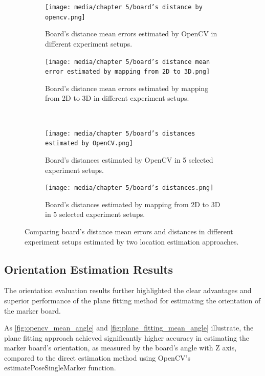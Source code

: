 \begin{figure}[htpb]
    \centering
    \begin{subfigure}[t]{0.45\textwidth}
        \centering
        \texttt{[image: media/chapter 5/board's distance by opencv.png]}
        \caption{Board's distance mean errors estimated by OpenCV in different experiment setups.}
        \label{fig:opencv_distance_mean_error}
    \end{subfigure}\hfill
    \begin{subfigure}[t]{0.45\textwidth}
        \centering
        \texttt{[image: media/chapter 5/board’s distance mean error estimated by mapping from 2D to 3D.png]}
        \caption{Board's distance mean errors estimated by mapping from 2D to 3D in different experiment setups.}
        \label{fig:2d_mapping_distanc_mean_error}
    \end{subfigure}\\
    \begin{subfigure}[t]{0.45\textwidth}
        \centering
        \texttt{[image: media/chapter 5/board’s distances estimated by OpenCV.png]}
        \caption{Board's distances estimated by OpenCV in 5 selected experiment setups.}
        \label{fig:opencv_distances}
    \end{subfigure}\hfill
    \begin{subfigure}[t]{0.45\textwidth}
        \centering
        \texttt{[image: media/chapter 5/board’s distances.png]}
        \caption{Board's distances estimated by mapping from 2D to 3D in 5 selected experiment setups.}
        \label{fig:2d_mapping_distances}
    \end{subfigure}
    \caption{Comparing board's distance mean errors and distances in different experiment setups estimated by two location estimation approaches.}
    \label{fig:distance_error_matrix}
\end{figure}


\subsection{Orientation Estimation Results}
The orientation evaluation results further highlighted the clear advantages and superior performance of the plane fitting method for estimating the orientation of the marker board.

As \cref{fig:opencv_mean_angle} and \cref{fig:plane_fitting_mean_angle} illustrate, the plane fitting approach achieved significantly higher accuracy in estimating the marker board's orientation, as measured by the board’s angle with Z axis, compared to the direct estimation method using OpenCV's estimatePoseSingleMarker function. 

